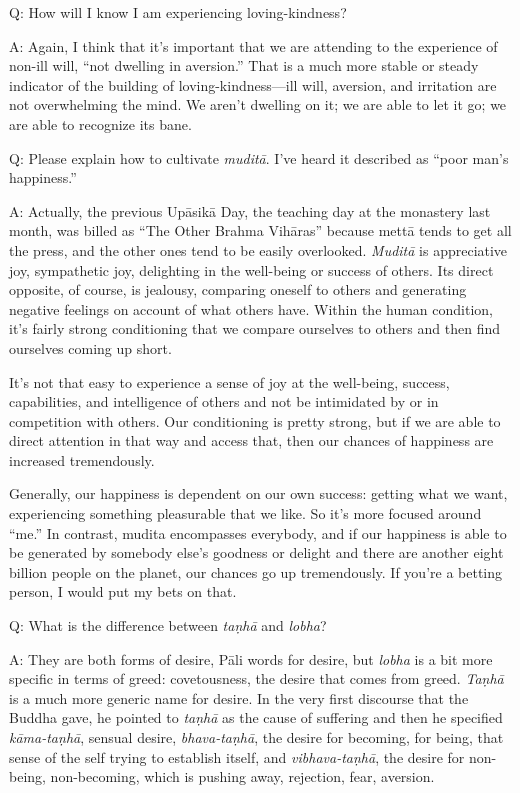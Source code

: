 \vspace{\the\qaskip}
Q: How will I know I am experiencing loving-kindness?

\vspace{\the\qaskip}
A: Again, I think that it’s important that we are attending to the
experience of non-ill will, “not dwelling in aversion.” That is a much
more stable or steady indicator of the building of loving-kindness—ill
will, aversion, and irritation are not overwhelming the mind. We aren’t
dwelling on it; we are able to let it go; we are able to recognize its
bane.

\vspace{\the\qaskip}
Q: Please explain how to cultivate \emph{muditā}. I’ve heard it
described as “poor man’s happiness.”

\vspace{\the\qaskip}
A: Actually, the previous Upāsikā Day, the teaching day at the monastery
last month, was billed as “The Other Brahma Vihāras” because mettā tends
to get all the press, and the other ones tend to be easily overlooked.
\emph{Muditā} is appreciative joy, sympathetic joy, delighting in the
well-being or success of others. Its direct opposite, of course, is
jealousy, comparing oneself to others and generating negative feelings
on account of what others have. Within the human condition, it’s fairly
strong conditioning that we compare ourselves to others and then find
ourselves coming up short.

It’s not that easy to experience a sense of joy at the well-being,
success, capabilities, and intelligence of others and not be intimidated
by or in competition with others. Our conditioning is pretty strong, but
if we are able to direct attention in that way and access that, then our
chances of happiness are increased tremendously.

Generally, our happiness is dependent on our own success: getting what
we want, experiencing something pleasurable that we like. So it’s more
focused around “me.” In contrast, mudita encompasses everybody, and if
our happiness is able to be generated by somebody else’s goodness or
delight and there are another eight billion people on the planet, our
chances go up tremendously. If you’re a betting person, I would put my
bets on that.

\vspace{\the\qaskip}
Q: What is the difference between \emph{taṇhā} and \emph{lobha}?

\vspace{\the\qaskip}
A: They are both forms of desire, Pāli words for desire, but
\emph{lobha} is a bit more specific in terms of greed: covetousness, the
desire that comes from greed. \emph{Taṇhā} is a much more generic name
for desire. In the very first discourse that the Buddha gave, he pointed
to \emph{taṇhā} as the cause of suffering and then he specified
\emph{kāma-taṇhā}, sensual desire, \emph{bhava-taṇhā}, the desire for
becoming, for being, that sense of the self trying to establish itself,
and \emph{vibhava-taṇhā}, the desire for non-being, non-becoming, which
is pushing away, rejection, fear, aversion.

